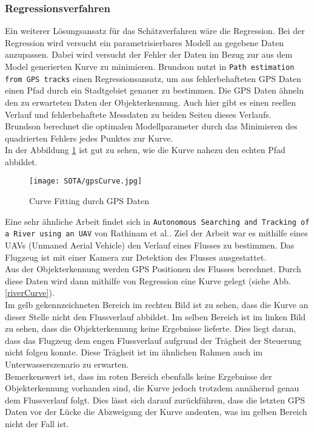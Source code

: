 \subsubsection{Regressionsverfahren}
Ein weiterer Lösungsansatz für das Schätzverfahren wäre die Regression. Bei der Regression wird versucht ein parametrisierbares Modell an gegebene Daten anzupassen. Dabei wird versucht der Fehler der Daten im Bezug zur aus dem Model generierten Kurve zu minimieren.
Brundson nutzt in \texttt{Path estimation from GPS tracks}\cite{brunsdon2007path} einen Regressionsansatz, um aus fehlerbehafteten GPS Daten einen Pfad durch ein Stadtgebiet genauer zu bestimmen. Die GPS Daten ähneln den zu erwarteten Daten der Objekterkennung. Auch hier gibt es einen reellen Verlauf und fehlerbehaftete Messdaten zu beiden Seiten dieses Verlaufs.\\
Brundson berechnet die optimalen Modellparameter durch das Minimieren des quadrierten Fehlers jedes Punktes zur Kurve.\\
In der Abbildung \ref{gpsfit} ist gut zu sehen, wie die Kurve nahezu den echten Pfad abbildet.
\begin{figure}[H]
\centering
\texttt{[image: SOTA/gpsCurve.jpg]}
\caption{Curve Fitting durch GPS Daten}
\label{gpsfit}
\end{figure}
Eine sehr ähnliche Arbeit findet sich in \texttt{Autonomous Searching and Tracking of a River using an UAV}\cite{rathinam2007autonomous} von Rathinam et al.. Ziel der Arbeit war es mithilfe eines UAVs (Unmaned Aerial Vehicle) den Verlauf eines Flusses zu bestimmen. Das Flugzeug ist mit einer Kamera zur Detektion des Flusses ausgestattet.\\
Aus der Objekterkennung werden GPS Positionen des Flusses berechnet. Durch diese Daten wird dann mithilfe von Regression eine Kurve gelegt (siehe Abb. \ref{riverCurve}).\\
Im gelb gekennzeichneten Bereich im rechten Bild ist zu sehen, dass die Kurve an dieser Stelle nicht den Flussverlauf abbildet. Im selben Bereich ist im linken Bild zu sehen, dass die Objekterkennung keine Ergebnisse lieferte. Dies liegt daran, dass das Flugzeug dem engen Flussverlauf aufgrund der Trägheit der Steuerung nicht folgen konnte. Diese Trägheit ist im ähnlichen Rahmen auch im Unterwasserszenario zu erwarten.\\
Bemerkenswert ist, dass im roten Bereich ebenfalls keine Ergebnisse der Objekterkennung vorhanden sind, die Kurve jedoch trotzdem annähernd genau dem Flussverlauf folgt. Dies lässt sich darauf zurückführen, dass die letzten GPS Daten vor der Lücke die Abzweigung der Kurve andeuten, was im gelben Bereich nicht der Fall ist.
